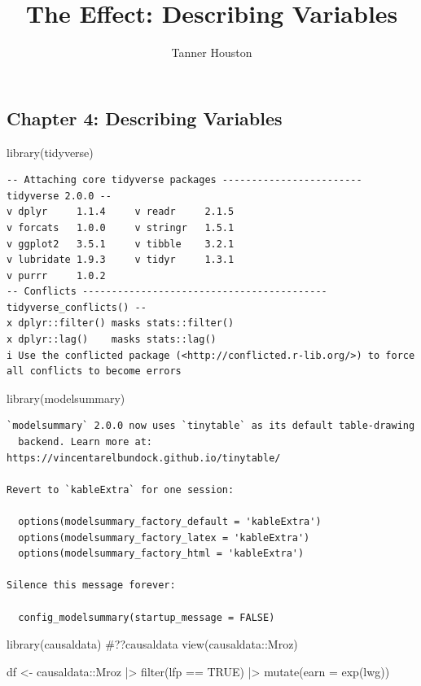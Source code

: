 \documentclass[
  letterpaper,
  DIV=11,
  numbers=noendperiod]{scrartcl}
\title{The Effect: Describing Variables}
\author{Tanner Houston}
\date{}
\newenvironment{Shaded}{\begin{snugshade}}{\end{snugshade}}
\newcommand{\AttributeTok}[1]{\textcolor[rgb]{0.40,0.45,0.13}{#1}}
\newcommand{\CommentTok}[1]{\textcolor[rgb]{0.37,0.37,0.37}{#1}}
\newcommand{\ConstantTok}[1]{\textcolor[rgb]{0.56,0.35,0.01}{#1}}
\newcommand{\FunctionTok}[1]{\textcolor[rgb]{0.28,0.35,0.67}{#1}}
\newcommand{\NormalTok}[1]{\textcolor[rgb]{0.00,0.23,0.31}{#1}}
\newcommand{\OtherTok}[1]{\textcolor[rgb]{0.00,0.23,0.31}{#1}}
\newcommand{\SpecialCharTok}[1]{\textcolor[rgb]{0.37,0.37,0.37}{#1}}
\begin{document}
\maketitle

\subsection{Chapter 4: Describing
Variables}\label{chapter-4-describing-variables}

\begin{Shaded}
\begin{Highlighting}[]
\FunctionTok{library}\NormalTok{(tidyverse)}
\end{Highlighting}
\end{Shaded}

\begin{verbatim}
-- Attaching core tidyverse packages ------------------------ tidyverse 2.0.0 --
v dplyr     1.1.4     v readr     2.1.5
v forcats   1.0.0     v stringr   1.5.1
v ggplot2   3.5.1     v tibble    3.2.1
v lubridate 1.9.3     v tidyr     1.3.1
v purrr     1.0.2     
-- Conflicts ------------------------------------------ tidyverse_conflicts() --
x dplyr::filter() masks stats::filter()
x dplyr::lag()    masks stats::lag()
i Use the conflicted package (<http://conflicted.r-lib.org/>) to force all conflicts to become errors
\end{verbatim}

\begin{Shaded}
\begin{Highlighting}[]
\FunctionTok{library}\NormalTok{(modelsummary)}
\end{Highlighting}
\end{Shaded}

\begin{verbatim}
`modelsummary` 2.0.0 now uses `tinytable` as its default table-drawing
  backend. Learn more at: https://vincentarelbundock.github.io/tinytable/

Revert to `kableExtra` for one session:

  options(modelsummary_factory_default = 'kableExtra')
  options(modelsummary_factory_latex = 'kableExtra')
  options(modelsummary_factory_html = 'kableExtra')

Silence this message forever:

  config_modelsummary(startup_message = FALSE)
\end{verbatim}

\begin{Shaded}
\begin{Highlighting}[]
\FunctionTok{library}\NormalTok{(causaldata)}
\CommentTok{\#??causaldata}
\FunctionTok{view}\NormalTok{(causaldata}\SpecialCharTok{::}\NormalTok{Mroz)}


\NormalTok{df }\OtherTok{\textless{}{-}}\NormalTok{ causaldata}\SpecialCharTok{::}\NormalTok{Mroz }\SpecialCharTok{|\textgreater{}}
  \FunctionTok{filter}\NormalTok{(lfp }\SpecialCharTok{==} \ConstantTok{TRUE}\NormalTok{) }\SpecialCharTok{|\textgreater{}}
  \FunctionTok{mutate}\NormalTok{(}\AttributeTok{earn =} \FunctionTok{exp}\NormalTok{(lwg))}
\end{Highlighting}
\end{Shaded}
\end{document}
